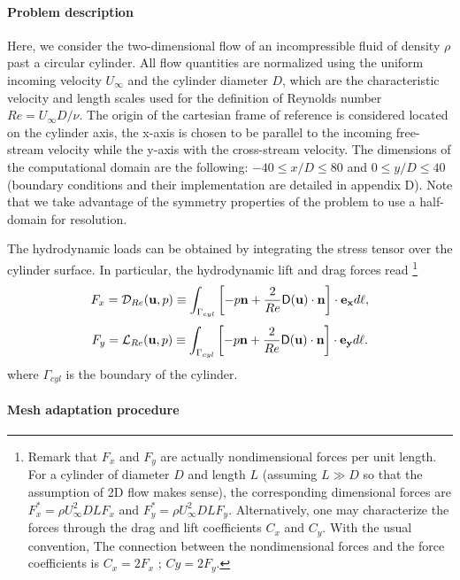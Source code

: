 \documentclass[twocolumn,10pt]{asme2ej}
\newcommand{\be}[1]{ \begin{equation} \label{#1}}
\newcommand{\ee}{\end{equation}}
\begin{document}
\paragraph{Problem description}
Here, we consider the two-dimensional flow of an incompressible fluid of density $\rho$ past a circular cylinder. 
All flow quantities are normalized using the uniform incoming velocity $U_{\infty}$ and the cylinder diameter $D$, 
which are the characteristic velocity and length scales used for the definition of Reynolds number $Re= U_{\infty} D / \nu$.
The origin of the cartesian frame of reference is considered located on the cylinder axis, the x-axis is chosen to be parallel to 
the incoming free-stream velocity while the y-axis with the cross-stream velocity. The dimensions of the computational domain are the following: $-40 \le x/D \le 80$ and $0 \le y/D \le 40$ (boundary conditions and their implementation are detailed in appendix D).
Note that we take advantage of the symmetry properties of the problem to use a half-domain for resolution. 

The hydrodynamic loads can be obtained by integrating the stress tensor over the cylinder surface.
In particular, the hydrodynamic lift and drag forces read
\footnote{ Remark that $F_x$ and $F_y$ are actually nondimensional forces per unit length. 
For a cylinder of diameter $D$ and length $L$ (assuming $L\gg D$ so that the assumption of 2D flow makes sense), 
the corresponding dimensional forces are $F_x^* = \rho U_\infty^2 D L F_x $ and $F_y^* = \rho U_\infty^2 D L F_y$. 
Alternatively, one may characterize the forces through the drag and lift coefficients $C_x$ and $C_y$. With the usual convention, 
The connection between the nondimensional forces and the force coefficients is $C_x = 2 F_x$ ; $Cy = 2 F_y$.
}
\be{drag}
F_x = {\cal D}_{Re} ({\bf u},p) \equiv 
  \int_{\Gamma_{cyl}} \left[-p {\bf n} + \frac{2}{Re} {\mathsf{D}}({\bf u}) \cdot {\bf n} \right]   \cdot {\bf e_x} d\ell,
\ee
\be{lift}
F_y = {\cal L}_{Re} ({\bf u},p) \equiv
  \int_{\Gamma_{cyl}} \left[-p {\bf n} + \frac{2}{Re} {\mathsf{D}}({\bf u}) \cdot {\bf n} \right]   \cdot {\bf e_y} d\ell. 
\ee
where $\Gamma_{cyl}$ is the boundary of the cylinder. %


\paragraph{Mesh adaptation procedure}
\end{document}
